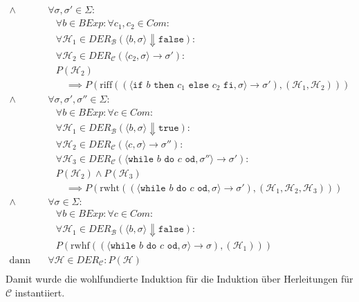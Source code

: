 \begin{align*}
						\land & \,\forall \sigma, \sigma' \in \Sigma : \tag{Zustände} \\
							&\quad \forall b \in \textit{BExp} : \forall c _ 1, c _ 2 \in \textit{Com} : \tag{Ausdrucksbestandteile} \\
							&\quad \forall \mathcal{H} _ 1 \in \textit{DER} _ \mathcal{B} (\langle b, \sigma \rangle \Downarrow \texttt{false}) : \tag{Kalkülfremde Herleitungen} \\
							&\quad \forall \mathcal{H} _ 2 \in \textit{DER} _ \mathcal{C} (\langle c _ 2, \sigma \rangle \rightarrow \sigma') : \tag{Herleitungen in Prämisse} \\
							&\quad P(\mathcal{H} _ 2) \tag{Prämisse} \\
							&\quad\quad \implies P(\text{riff}((\langle \texttt{if } b \texttt{ then } c _ 1 \texttt{ else } c _ 2 \texttt{ fi}, \sigma \rangle \rightarrow \sigma'), (\mathcal{H} _ 1, \mathcal{H} _ 2))) \tag{Konklusion} \\
						\land & \,\forall \sigma, \sigma', \sigma'' \in \Sigma : \tag{Zustände} \\
							&\quad \forall b \in \textit{BExp} : \forall c \in \textit{Com} : \tag{Ausdrucksbestandteile} \\
							&\quad \forall \mathcal{H} _ 1 \in \textit{DER} _ \mathcal{B} (\langle b, \sigma \rangle \Downarrow \texttt{true}) : \tag{Kalkülfremde Herleitungen} \\
							&\quad \forall \mathcal{H} _ 2 \in \textit{DER} _ \mathcal{C} (\langle c, \sigma \rangle \rightarrow \sigma'') : \tag{Herleitungen in Prämisse} \\
							&\quad \forall \mathcal{H} _ 3 \in \textit{DER} _ \mathcal{C} (\langle \texttt{while } b \texttt{ do } c \texttt{ od}, \sigma'' \rangle \rightarrow \sigma') : \tag{Herleitungen in Prämisse} \\
							&\quad P(\mathcal{H} _ 2) \land P(\mathcal{H} _ 3) \tag{Prämisse} \\
							&\quad\quad \implies P(\text{rwht}((\langle \texttt{while } b \texttt{ do } c \texttt{ od}, \sigma \rangle \rightarrow \sigma'), (\mathcal{H} _ 1, \mathcal{H} _ 2, \mathcal{H} _ 3))) \tag{Konklusion} \\
						\land & \,\forall \sigma \in \Sigma : \tag{Zustände} \\
							&\quad \forall b \in \textit{BExp} : \forall c \in \textit{Com} : \tag{Ausdrucksbestandteile} \\
							&\quad \forall \mathcal{H} _ 1 \in \textit{DER} _ \mathcal{B} (\langle b, \sigma \rangle \Downarrow \texttt{false}) : \tag{Kalkülfremde Herleitungen} \\
							&\quad P(\text{rwhf}((\langle \texttt{while } b \texttt{ do } c \texttt{ od}, \sigma \rangle \rightarrow \sigma), (\mathcal{H} _ 1))) \tag{Konklusion} \\
						\text{dann gilt:} & \,\forall \mathcal{H} \in \textit{DER} _ \mathcal{C} : P(\mathcal{H}) \\
				    \end{align*}
				    Damit wurde die wohlfundierte Induktion für die Induktion über Herleitungen für $ \mathcal{C} $ instantiiert.
			    
